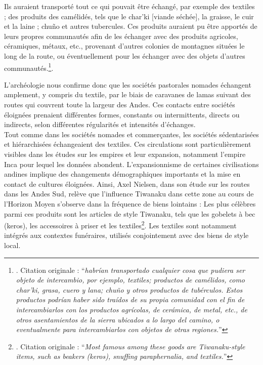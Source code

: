 \begin{citer}
	Ils auraient transporté tout ce qui pouvait être échangé, par exemple des textiles ; des produits des camélidés, tels que le char'ki [viande séchée], la graisse, le cuir et la laine ; chuño et autres tubercules. Ces produits auraient pu être apportés de leurs propres communautés afin de les échanger avec des produits agricoles, céramiques, métaux, etc., provenant d'autres colonies de montagnes situées le long de la route, ou éventuellement pour les échanger avec des objets d'autres communautés.\footnote{\cite[p.~28]{youngMontanaMarIntercambio2017}. Citation originale : \textquotedblleft \textit{habrían transportado cualquier cosa que pudiera ser objeto de intercambio, por ejemplo, textiles; productos de camélidos, como char'ki, grasa, cuero y lana; chuño y otros productos de tubérculos. Estos productos podrían haber sido traídos de su propia comunidad con el fin de intercambiarlos con los productos agrícolas, de cerámica, de metal, etc., de otros asentamientos de la sierra ubicados a lo largo del camino, o eventualmente para intercambiarlos con objetos de otras regiones.}\textquotedblright}.
\end{citer}

L'archéologie nous confirme donc que les sociétés pastorales nomades échangent amplement, y compris du textile, par le biais de caravanes de lamas suivant des routes qui couvrent toute la largeur des Andes. Ces contacts entre sociétés éloignées prenaient différentes formes, constants ou intermittents, directs ou indirects, selon différentes régularités et intensités d'échanges. \\


Tout comme dans les sociétés nomades et commerçantes, les sociétés sédentarisées et hiérarchisées échangeaient des textiles. Ces circulations sont particulièrement visibles dans les études sur les empires et leur expansion, notamment l'empire Inca pour lequel les données abondent. L'expansionnisme de certaines civilisations andines implique des changements démographiques importants et la mise en contact de cultures éloignées. Ainsi, Axel Nielsen, dans son étude sur les routes dans les Andes Sud, relève que l'influence Tiwanaku dans cette zone au cours de l'Horizon Moyen s'observe dans la fréquence de biens lointains : \og Les plus célèbres parmi ces produits sont les articles de style Tiwanaku, tels que les gobelets à bec (keros), les accessoires à priser et les textiles\fg\footnote{\cite[p.~401]{nielsenCirculatingObjectsConstitution2013}. Citation originale : \textquotedblleft \textit{Most famous among these goods are Tiwanaku-style items, such as beakers (keros), snuffing paraphernalia, and textiles.}\textquotedblright}. Les textiles sont notamment intégrés aux contextes funéraires, utilisés conjointement avec des biens de style local. 

